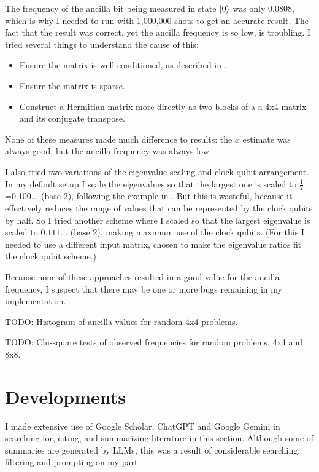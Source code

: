 \documentclass[12pt]{extarticle}
\begin{document}
The frequency of the ancilla bit being measured in state $\ket{0}$ was only 0.0808, which is why I needed to run with 1,000,000 shots to get an accurate result.
The fact that the result was correct, yet the ancilla frequency is so low, is troubling.
I tried several things to understand the cause of this:
\begin{itemize}
\item Ensure the matrix is well-conditioned, as described in \cite{hhl2009}.
\item Ensure the matrix is sparse.
\item Construct a Hermitian matrix more directly as two blocks of a a 4x4 matrix and its conjugate transpose.
\end{itemize}
None of these measures made much difference to results: the $x$ estimate was always good, but the ancilla frequency was always low.

I also tried two variations of the eigenvalue scaling and clock qubit arrangement.
In my default setup I scale the eigenvalues so that the largest one is scaled to $\frac{1}{2}$=0.100... (base 2), following the example in \cite{zaman2023step}.
But this is wasteful, because it effectively reduces the range of values that can be represented by the clock qubits by half.
So I tried another scheme where I scaled so that the largest eigenvalue is scaled to $0.111...$ (base 2), making maximum use of the clock qubits.
(For this I needed to use a different input matrix, chosen to make the eigenvalue ratios fit the clock qubit scheme.)

Because none of these approaches resulted in a good value for the ancilla frequency, I suspect that there may be one or more bugs remaining in my implementation.

TODO: Histogram of ancilla values for random 4x4 problems.

TODO: Chi-square tests of observed frequencies for random problems, 4x4 and 8x8.

\section{Developments}\label{sec:developments}

\begin{framed}
I made extensive use of Google Scholar, ChatGPT and Google Gemini in searching for, citing, and summarizing literature in this section.
Although some of summaries are generated by LLMs, this was a result of considerable searching, filtering and prompting on my part.
\end{framed}
\end{document}
